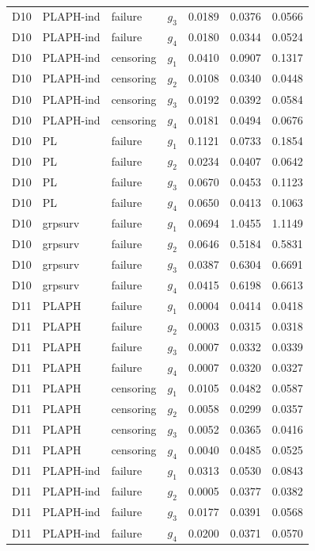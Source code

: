 \begin{longtable}{clllrrr}
D10 & PLAPH-ind & failure & $g_{3}$ & 0.0189 & 0.0376 & 0.0566 \\
D10 & PLAPH-ind & failure & $g_{4}$ & 0.0180 & 0.0344 & 0.0524 \\
D10 & PLAPH-ind & censoring & $g_{1}$ & 0.0410 & 0.0907 & 0.1317 \\
D10 & PLAPH-ind & censoring & $g_{2}$ & 0.0108 & 0.0340 & 0.0448 \\
D10 & PLAPH-ind & censoring & $g_{3}$ & 0.0192 & 0.0392 & 0.0584 \\
D10 & PLAPH-ind & censoring & $g_{4}$ & 0.0181 & 0.0494 & 0.0676 \\
D10 & PL & failure & $g_{1}$ & 0.1121 & 0.0733 & 0.1854 \\
D10 & PL & failure & $g_{2}$ & 0.0234 & 0.0407 & 0.0642 \\
D10 & PL & failure & $g_{3}$ & 0.0670 & 0.0453 & 0.1123 \\
D10 & PL & failure & $g_{4}$ & 0.0650 & 0.0413 & 0.1063 \\
D10 & grpsurv & failure & $g_{1}$ & 0.0694 & 1.0455 & 1.1149 \\
D10 & grpsurv & failure & $g_{2}$ & 0.0646 & 0.5184 & 0.5831 \\
D10 & grpsurv & failure & $g_{3}$ & 0.0387 & 0.6304 & 0.6691 \\
D10 & grpsurv & failure & $g_{4}$ & 0.0415 & 0.6198 & 0.6613 \\
D11 & PLAPH & failure & $g_{1}$ & 0.0004 & 0.0414 & 0.0418 \\
D11 & PLAPH & failure & $g_{2}$ & 0.0003 & 0.0315 & 0.0318 \\
D11 & PLAPH & failure & $g_{3}$ & 0.0007 & 0.0332 & 0.0339 \\
D11 & PLAPH & failure & $g_{4}$ & 0.0007 & 0.0320 & 0.0327 \\
D11 & PLAPH & censoring & $g_{1}$ & 0.0105 & 0.0482 & 0.0587 \\
D11 & PLAPH & censoring & $g_{2}$ & 0.0058 & 0.0299 & 0.0357 \\
D11 & PLAPH & censoring & $g_{3}$ & 0.0052 & 0.0365 & 0.0416 \\
D11 & PLAPH & censoring & $g_{4}$ & 0.0040 & 0.0485 & 0.0525 \\
D11 & PLAPH-ind & failure & $g_{1}$ & 0.0313 & 0.0530 & 0.0843 \\
D11 & PLAPH-ind & failure & $g_{2}$ & 0.0005 & 0.0377 & 0.0382 \\
D11 & PLAPH-ind & failure & $g_{3}$ & 0.0177 & 0.0391 & 0.0568 \\
D11 & PLAPH-ind & failure & $g_{4}$ & 0.0200 & 0.0371 & 0.0570 \\

\end{longtable}
